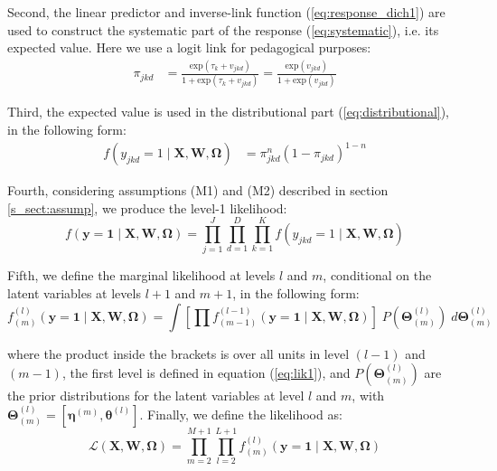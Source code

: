 \noindent Second, the linear predictor and inverse-link function (\ref{eq:response_dich1}) are used to construct the systematic part of the response (\ref{eq:systematic}), i.e. its expected value. Here we use a logit link for pedagogical purposes:
%
\begin{equation} \label{eq:prob}
	\begin{split}
		\pi_{jkd} &= \frac{ \text{exp}(\tau_{k} + v_{jkd}) }{ 1 + \text{exp}(\tau_{k} + v_{jkd}) } = \frac{ \text{exp}(v_{jkd}) }{ 1 + \text{exp}(v_{jkd}) }
	\end{split}	
\end{equation}

\noindent Third, the expected value is used in the distributional part (\ref{eq:distributional}), in the following form:
%
\begin{equation} \label{eq:dist}
	\begin{split}
		f \left( y_{jkd}=1 \; | \; \mathbf{X}, \mathbf{W}, \pmb{\Omega} \right) &= \pi_{jkd}^{n} (1 - \pi_{jkd})^{1-n}
	\end{split}
\end{equation}

\noindent Fourth, considering assumptions (M1) and (M2) described in section \ref{s_sect:assump}, we produce the level-1 likelihood:
%
\begin{equation} \label{eq:lik1}
	f \left( \mathbf{y}=\mathbf{1} \; | \; \mathbf{X}, \mathbf{W}, \pmb{\Omega} \right) = \prod_{j=1}^{J} \prod_{d=1}^{D} \prod_{k=1}^{K} f \left( y_{jkd}=1 \; | \; \mathbf{X}, \mathbf{W}, \pmb{\Omega} \right)
\end{equation}

\noindent Fifth, we define the marginal likelihood at levels $l$ and $m$, conditional on the latent variables at levels $l+1$ and $m+1$, in the following form:
%
\begin{equation} \label{eq:lik2}
	f^{(l)}_{(m)} \left( \mathbf{y}=\mathbf{1} \; | \; \mathbf{X}, \mathbf{W}, \pmb{\Omega} \right) = \int \left[ \prod f^{(l-1)}_{(m-1)} \left( \mathbf{y}=\mathbf{1} \; | \; \mathbf{X}, \mathbf{W}, \pmb{\Omega} \right) \right] \; P( \pmb{\Theta}^{(l)}_{(m)} ) \; d\pmb{\Theta}^{(l)}_{(m)}
\end{equation}

\noindent where the product inside the brackets is over all units in level $(l-1)$ and $(m-1)$, the first level is defined in equation (\ref{eq:lik1}), and $P( \pmb{\Theta}^{(l)}_{(m)} )$ are the prior distributions for the latent variables at level $l$ and $m$, with $\pmb{\Theta}^{(l)}_{(m)} = [\pmb{\eta}^{(m)}, \pmb{\theta}^{(l)}]$. Finally, we define the likelihood as:
%
\begin{equation} \label{eq:lik3}
	\mathcal{L}(\mathbf{X}, \mathbf{W}, \pmb{\Omega}) = \prod_{m=2}^{M+1} \prod_{l=2}^{L+1} f^{(l)}_{(m)} \left( \mathbf{y}=\mathbf{1} \; | \; \mathbf{X}, \mathbf{W}, \pmb{\Omega} \right)
\end{equation}

